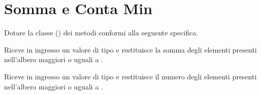 \section{Somma e Conta Min}
Dotare la classe  () dei metodi conformi alla seguente specifica.

\begin{methodslist}

 {
Riceve in ingresso un valore  di tipo  e restituisce la somma degli elementi presenti
nell'albero maggiori o uguali a .
}

 {
Riceve in ingresso un valore  di tipo  e restituisce il numero degli elementi presenti
nell'albero maggiori o uguali a .
}

\end{methodslist}